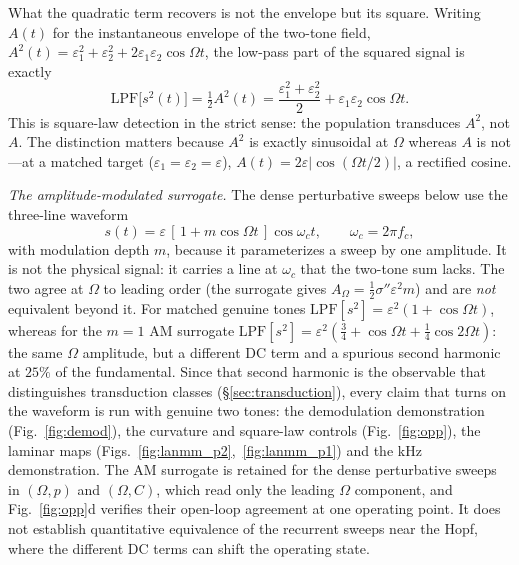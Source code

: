 \documentclass[11pt,a4paper]{article}
\newcommand{\Sig}{\sigma}
\newcommand{\half}{\tfrac{1}{2}}
\begin{document}
What the quadratic term recovers is not the envelope but its square. Writing $A(t)$ for
the instantaneous envelope of the two-tone field,
$A^2(t)=\varepsilon_1^2+\varepsilon_2^2+2\varepsilon_1\varepsilon_2\cos\Omega t$, the
low-pass part of the squared signal is exactly
\begin{equation}
\mathrm{LPF}\big[s^2(t)\big]=\half A^2(t)
=\frac{\varepsilon_1^2+\varepsilon_2^2}{2}+\varepsilon_1\varepsilon_2\cos\Omega t .
\label{eq:sqenv}
\end{equation}
This is square-law detection in the strict sense: the population transduces $A^2$, not
$A$. The distinction matters because $A^2$ is exactly sinusoidal at $\Omega$
whereas $A$ is not---at a matched target ($\varepsilon_1=\varepsilon_2=\varepsilon$),
$A(t)=2\varepsilon|\cos(\Omega t/2)|$, a rectified cosine.

\emph{The amplitude-modulated surrogate.} The dense perturbative sweeps below use the
three-line waveform
\begin{equation}
s(t)=\varepsilon\,[\,1+m\cos\Omega t\,]\cos\omega_c t,\qquad \omega_c=2\pi f_c ,
\label{eq:amsur}
\end{equation}
with modulation depth $m$, because it parameterizes a sweep by one amplitude. It is not
the physical signal: it carries a line at $\omega_c$ that the two-tone sum lacks. The two
agree at $\Omega$ to leading order (the surrogate gives
$A_\Omega=\half\Sig''\varepsilon^2m$) and are \emph{not} equivalent beyond it. For matched genuine tones $\mathrm{LPF}[s^2]=\varepsilon^2(1+\cos\Omega t)$,
whereas for the $m=1$ AM surrogate
$\mathrm{LPF}[s^2]=\varepsilon^2(\tfrac34+\cos\Omega t+\tfrac14\cos2\Omega t)$: the same
$\Omega$ amplitude, but a different DC term and a spurious second harmonic at $25\%$ of
the fundamental. Since that second harmonic is the observable that
distinguishes transduction classes (\S\ref{sec:transduction}), every claim that turns on
the waveform is run with genuine two tones: the demodulation demonstration
(Fig.~\ref{fig:demod}), the curvature and square-law controls (Fig.~\ref{fig:opp}), the
laminar maps (Figs.~\ref{fig:lanmm_p2},~\ref{fig:lanmm_p1}) and the kHz demonstration.
The AM surrogate is retained for the dense perturbative sweeps in $(\Omega,p)$ and
$(\Omega,C)$, which read only the leading $\Omega$ component, and
Fig.~\ref{fig:opp}d verifies their open-loop agreement at one operating point.
It does not establish quantitative equivalence of the recurrent sweeps near the Hopf,
where the different DC terms can shift the operating state.
\end{document}
